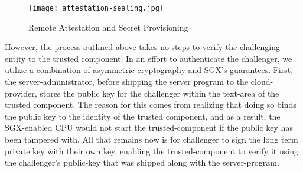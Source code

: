 \documentclass[../main.tex]{subfiles}
\begin{document}
\begin{figure}[H]
	\centering
	\texttt{[image: attestation-sealing.jpg]}
	\caption{Remote Attestation and Secret Provisioning}
	\label{fig:attest}
\end{figure}

However, the process outlined above takes no steps to verify the challenging entity to the trusted component. In an effort to authenticate the
challenger, we utilize a combination of asymmetric cryptography and SGX's guarantees.
First, the server-administrator, before shipping the server program to the cloud-provider, stores the public key for the challenger within the 
text-area of the trusted component. The reason for this comes from realizing that doing so binds the public key to the identity of the trusted component, and
as a result, the SGX-enabled CPU would not start the trusted-component if the public key has been tampered with. All that remains now is for challenger to sign
the long term private key with their own key, enabling the trusted-component to verify it using the challenger's public-key that was shipped along with the server-program.
\end{document}
